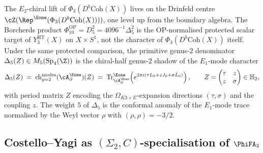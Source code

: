 \begin{remark}
\label{rem:E2-data-hides-derived-centre-twisted-M}
The $E_2$-chiral lift of $\Phi_3(D^b\mathrm{Coh}(X))$ lives on the
Drinfeld centre $\cZ(\Rep^{\Eone}(\Phi_3(D^b\mathrm{Coh}(X))))$, one
level up from the boundary algebra. The Borcherds product
$\Phi_{10}^{\mathrm{OP}}=D_5^2=4096^{-1}\Delta_5^2$ is the
OP-normalised protected scalar target of \(Y^{\mathrm{HT}}_3(X)\) on
\(X \times S^1\), not the character of
\(\Phi_3(D^b\mathrm{Coh}(X))\) itself. Under the same protected
comparison, the primitive genus-$2$ denominator
$\Delta_5(Z) \in M_5(\mathrm{Sp}_4(\Z))$ is the chiral-half genus-$2$
shadow of the $E_1$-mode character
\[
 \Delta_5(Z)
 \;=\;
 \mathrm{ch}^{\mathrm{modes}}_{g=2}(\cA^{\Eone}_\partial)(Z)
 \;=\;
 \mathrm{Tr}^{\Eone}_{\cA^{\Eone}_\partial}\!\left(
 e^{2\pi i(\tau L_0 + z J_0 + \sigma \bar L_0)}
 \right),
 \qquad
 Z = \begin{pmatrix}\tau & z \\ z & \sigma\end{pmatrix}
 \in \mathbb{H}_2,
\]
with period matrix $Z$ encoding the $\Omega_{K3 \times E}$-expansion
directions $(\tau, \sigma)$ and the coupling $z$. The weight $5$ of
$\Delta_5$ is the conformal anomaly of the $E_1$-mode trace normalised
by the Weyl vector $\rho$ with $(\rho, \rho) = -3/2$.
\end{remark}

\subsection{Costello--Yagi as \texorpdfstring{$(\Sigma_2, C)$}{(Sigma-2, C)}-specialisation of \texorpdfstring{$\PhiFA_3$}{PhiFA-3}}
\label{subsec:costello-yagi-as-SpCh}

